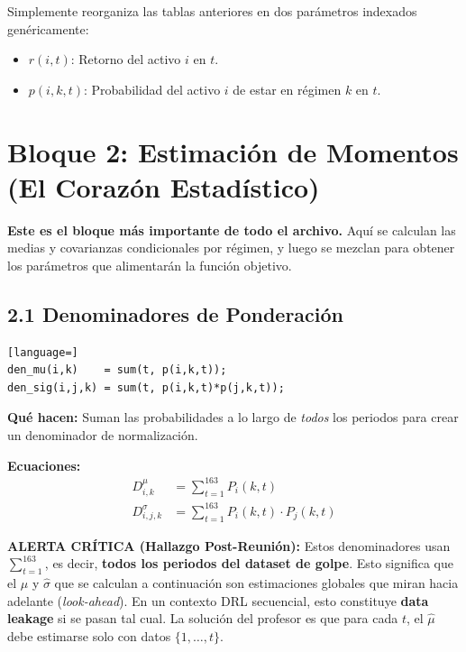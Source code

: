 \documentclass[11pt,a4paper]{article}
\begin{document}
Simplemente reorganiza las tablas anteriores en dos parámetros indexados genéricamente:
\begin{itemize}
    \item $r(i,t)$: Retorno del activo $i$ en $t$.
    \item $p(i,k,t)$: Probabilidad del activo $i$ de estar en régimen $k$ en $t$.
\end{itemize}

\section{Bloque 2: Estimación de Momentos (El Corazón Estadístico)}

\textbf{Este es el bloque más importante de todo el archivo.} Aquí se calculan las medias y covarianzas condicionales por régimen, y luego se mezclan para obtener los parámetros que alimentarán la función objetivo.

\subsection{2.1 Denominadores de Ponderación}
\begin{lstlisting}[language=]
den_mu(i,k)    = sum(t, p(i,k,t));
den_sig(i,j,k) = sum(t, p(i,k,t)*p(j,k,t));
\end{lstlisting}

\textbf{Qué hacen:} Suman las probabilidades a lo largo de \textit{todos} los periodos para crear un denominador de normalización.

\textbf{Ecuaciones:}
\begin{align}
    D^{\mu}_{i,k} &= \sum_{t=1}^{163} P_i(k,t) \\
    D^{\sigma}_{i,j,k} &= \sum_{t=1}^{163} P_i(k,t) \cdot P_j(k,t)
\end{align}

\colorbox{yellow!30}{\parbox{0.9\textwidth}{
\textbf{ALERTA CRÍTICA (Hallazgo Post-Reunión):} Estos denominadores usan $\sum_{t=1}^{163}$, es decir, \textbf{todos los periodos del dataset de golpe}. Esto significa que el $\hat{\mu}$ y $\hat{\sigma}$ que se calculan a continuación son estimaciones globales que miran hacia adelante (\textit{look-ahead}). En un contexto DRL secuencial, esto constituye \textbf{data leakage} si se pasan tal cual. La solución del profesor es que para cada $t$, el $\hat{\mu}$ debe estimarse solo con datos $\{1, \ldots, t\}$.
}}
\end{document}
